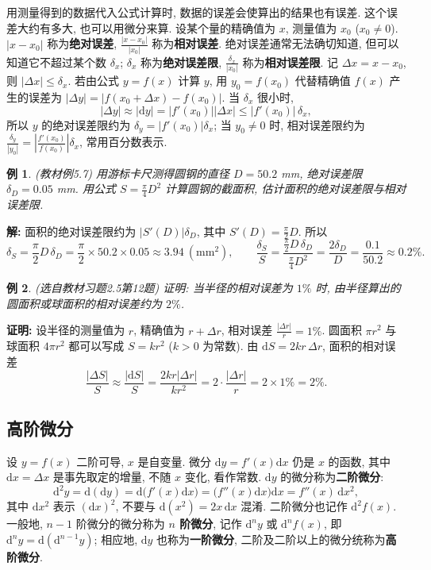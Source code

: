 \documentclass[UTF8,openany]{ctexbook}
\theoremstyle{chinesetextbook}
\newtheorem{example}{例}[section]
\newenvironment{cnproof}{\par\indent\textbf{证明:} \ignorespaces}{\par}
\newenvironment{cnsolution}{\par\indent\textbf{解:} \ignorespaces}{\par}
\newcommand{\dd}{\mathrm d}
\begin{document}
用测量得到的数据代入公式计算时, 数据的误差会使算出的结果也有误差. 这个误差大约有多大, 也可以用微分来算. 设某个量的精确值为 $x$, 测量值为 $x_0$ ($x_0\ne0$). $|x-x_0|$ 称为\textbf{绝对误差}, $\displaystyle\frac{|x-x_0|}{|x_0|}$ 称为\textbf{相对误差}. 绝对误差通常无法确切知道, 但可以知道它不超过某个数 $\delta_x$; $\delta_x$ 称为\textbf{绝对误差限}, $\displaystyle\frac{\delta_x}{|x_0|}$ 称为\textbf{相对误差限}. 记 $\Delta x=x-x_0$, 则 $|\Delta x|\le\delta_x$. 若由公式 $y=f(x)$ 计算 $y$, 用 $y_0=f(x_0)$ 代替精确值 $f(x)$ 产生的误差为 $|\Delta y|=|f(x_0+\Delta x)-f(x_0)|$. 当 $\delta_x$ 很小时,
\[
|\Delta y|\approx|\dd y|=|f'(x_0)||\Delta x|\le|f'(x_0)|\,\delta_x,
\]
所以 $y$ 的绝对误差限约为 $\delta_y=|f'(x_0)|\delta_x$; 当 $y_0\ne0$ 时, 相对误差限约为 $\displaystyle\frac{\delta_y}{|y_0|}=\left|\frac{f'(x_0)}{f(x_0)}\right|\delta_x$, 常用百分数表示.
\begin{example}\label{ex:c2-5-7}
\textnormal{(教材例5.7)} 用游标卡尺测得圆钢的直径 $D=50.2$ mm, 绝对误差限 $\delta_D=0.05$ mm. 用公式 $\displaystyle S=\frac\pi4D^2$ 计算圆钢的截面积, 估计面积的绝对误差限与相对误差限.
\end{example}
\begin{cnsolution}
面积的绝对误差限约为 $|S'(D)|\delta_D$, 其中 $\displaystyle S'(D)=\frac\pi2D$. 所以
\[
\delta_S=\frac\pi2D\,\delta_D=\frac\pi2\times50.2\times0.05\approx3.94\ (\text{mm}^2),\qquad\frac{\delta_S}S=\frac{\frac\pi2D\,\delta_D}{\frac\pi4D^2}=\frac{2\delta_D}D=\frac{0.1}{50.2}\approx0.2\%.
\]
\end{cnsolution}
\begin{example}\label{ex:c2-h5-12}
\textnormal{(选自教材习题2.5第12题)} 证明: 当半径的相对误差为 $1\%$ 时, 由半径算出的圆面积或球面积的相对误差约为 $2\%$.
\end{example}
\begin{cnproof}
设半径的测量值为 $r$, 精确值为 $r+\Delta r$, 相对误差 $\displaystyle\frac{|\Delta r|}r=1\%$. 圆面积 $\pi r^2$ 与球面积 $4\pi r^2$ 都可以写成 $S=kr^2$ ($k>0$ 为常数). 由 $\dd S=2kr\,\Delta r$, 面积的相对误差
\[
\frac{|\Delta S|}S\approx\frac{|\dd S|}S=\frac{2kr|\Delta r|}{kr^2}=2\cdot\frac{|\Delta r|}r=2\times1\%=2\%.
\]
\end{cnproof}
\subsection{高阶微分}
设 $y=f(x)$ 二阶可导, $x$ 是自变量. 微分 $\dd y=f'(x)\dd x$ 仍是 $x$ 的函数, 其中 $\dd x=\Delta x$ 是事先取定的增量, 不随 $x$ 变化, 看作常数. $\dd y$ 的微分称为\textbf{二阶微分}:
\[
\dd^2y=\dd(\dd y)=\dd\bigl(f'(x)\dd x\bigr)=\bigl(f''(x)\dd x\bigr)\dd x=f''(x)\,\dd x^2,
\]
其中 $\dd x^2$ 表示 $(\dd x)^2$, 不要与 $\dd(x^2)=2x\,\dd x$ 混淆. 二阶微分也记作 $\dd^2f(x)$. 一般地, $n-1$ 阶微分的微分称为 \textbf{$n$ 阶微分}, 记作 $\dd^ny$ 或 $\dd^nf(x)$, 即 $\dd^ny=\dd(\dd^{n-1}y)$; 相应地, $\dd y$ 也称为\textbf{一阶微分}, 二阶及二阶以上的微分统称为\textbf{高阶微分}.
\end{document}

